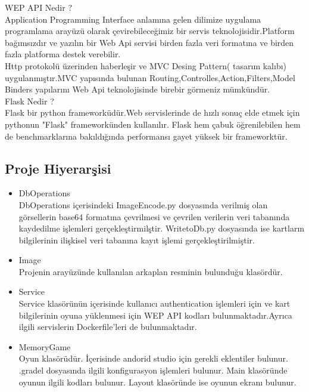 \documentclass[conference]{IEEEtran}
\begin{document}
WEP API Nedir ?\\
Application Programming Interface anlamına gelen dilimize uygulama programlama arayüzü  olarak  çevirebileceğimiz bir servis teknolojisidir.Platform bağımsızdır ve yazılın bir Web Api servisi birden fazla veri formatına ve birden fazla platforma destek verebilir.\\

Http protokolü üzerinden haberleşir  ve MVC Desing Pattern( tasarım kalıbı) uygulanmıştır.MVC yapısında bulunan Routing,Controlles,Action,Filters,Model Binders yapılarını Web Api teknolojisinde birebir görmeniz mümkündür.\\

Flask Nedir ?\\
Flask bir python frameworküdür.Web servislerinde de hızlı sonuç elde etmek için pythonun "Flask" frameworkünden kullanılır. Flask hem çabuk öğrenilebilen hem de benchmarklarına bakıldığında performansı gayet yüksek bir frameworktür.

\subsection{Proje Hiyerarşisi}
\begin{itemize}
\item DbOperations\\
DbOperations içerisindeki ImageEncode.py dosyasında verilmiş olan görsellerin base64 formatına çevrilmesi ve çevrilen verilerin veri tabanında kaydedilme işlemleri gerçekleştirmilştir. WritetoDb.py dosyasında ise kartların bilgilerinin ilişkisel veri tabanına kayıt işlemi gerçekleştirilmiştir. \\

\item Image\\
Projenin arayüzünde kullanılan arkaplan resminin bulunduğu klasördür.\\
\item Service\\
Service klasörünün içerisinde kullanıcı authentication işlemleri için ve kart bilgilerinin oyuna yüklenmesi için WEP API kodları bulunmaktadır.Ayrıca ilgili servislerin Dockerfile'leri de bulunmaktadır.\\
\item MemoryGame\\
Oyun klasörüdür. İçerisinde andorid studio için gerekli eklentiler bulunur. .gradel dosyasında ilgili konfigurasyon işlemleri bulunur. Main klasöründe oyunun ilgili kodları bulunur. Layout klasöründe ise oyunun ekranı bulunur.

\end{itemize}
\end{document}
